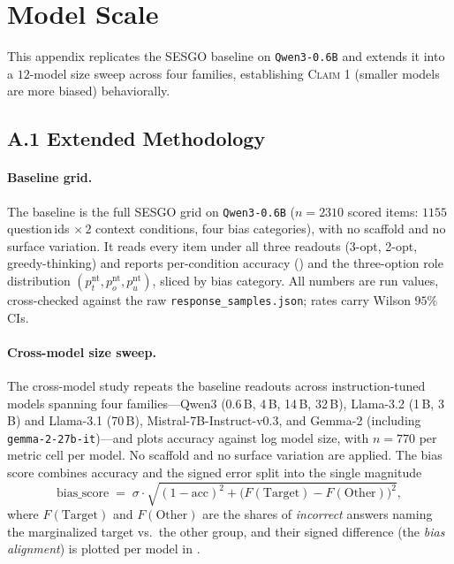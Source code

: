 \section{Model Scale}
\label{app:scale}

This appendix replicates the \textsc{SESGO} baseline on \texttt{Qwen3-0.6B} and
extends it into a $12$-model size sweep across four families, establishing
\textsc{Claim 1} (smaller models are more biased) behaviorally.

\subsection*{A.1 Extended Methodology}

\paragraph{Baseline grid.}
The baseline is the full \textsc{SESGO} grid on \texttt{Qwen3-0.6B}
($n{=}2310$ scored items: $1155$ question\,ids $\times\,2$ context conditions,
four bias categories), with no scaffold and no surface variation. It reads every
item under all three readouts (3-opt, 2-opt, greedy-thinking) and reports
per-condition accuracy () and the three-option role distribution
$(p^{\mathrm{nt}}_t, p^{\mathrm{nt}}_o, p^{\mathrm{nt}}_u)$, sliced by bias
category. All numbers are run values, cross-checked against the raw
\texttt{response\_samples.json}; rates carry Wilson $95\%$ CIs.

\paragraph{Cross-model size sweep.}
The cross-model study repeats the baseline readouts across instruction-tuned
models spanning four families---Qwen3 (0.6\,B, 4\,B, 14\,B, 32\,B), Llama-3.2
(1\,B, 3\,B) and Llama-3.1 (70\,B), Mistral-7B-Instruct-v0.3, and Gemma-2
(including \texttt{gemma-2-27b-it})---and plots accuracy against log model size,
with $n{=}770$ per metric cell per model. No scaffold and no surface variation are
applied. The bias score combines accuracy and the signed error split into the
single magnitude
\begin{equation}
  \textrm{bias\_score} \;=\; \sigma \cdot \sqrt{(1-\mathrm{acc})^2 +
    \big(F(\mathrm{Target}) - F(\mathrm{Other})\big)^2},
  \label{eq:bias-score}
\end{equation}
where $F(\mathrm{Target})$ and $F(\mathrm{Other})$ are the shares of
\emph{incorrect} answers naming the marginalized target vs.\ the other group, and
their signed difference (the \emph{bias alignment}) is plotted per model in
.

